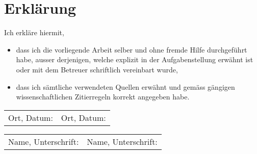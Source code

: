 \chapter*{Erklärung}

Ich erkläre hiermit,
\begin{itemize}
\item dass ich die vorliegende Arbeit selber und ohne fremde Hilfe durchgeführt habe, ausser derjenigen, welche explizit in der Aufgabenstellung erwähnt ist oder mit dem Betreuer schriftlich vereinbart wurde,
\item dass ich sämtliche verwendeten Quellen erwähnt und gemäss gängigen wissenschaftlichen Zitierregeln korrekt angegeben habe.
\end{itemize}

\vspace{3cm}

\begin{tabular}{p{0.5\twocelltabwidth}p{0.5\twocelltabwidth}}
Ort, Datum: & Ort, Datum: \\ 
\end{tabular} 

\vspace{1cm}

\begin{tabular}{p{0.5\twocelltabwidth}p{0.5\twocelltabwidth}}
Name, Unterschrift: & Name, Unterschrift: \\ 
\end{tabular} 